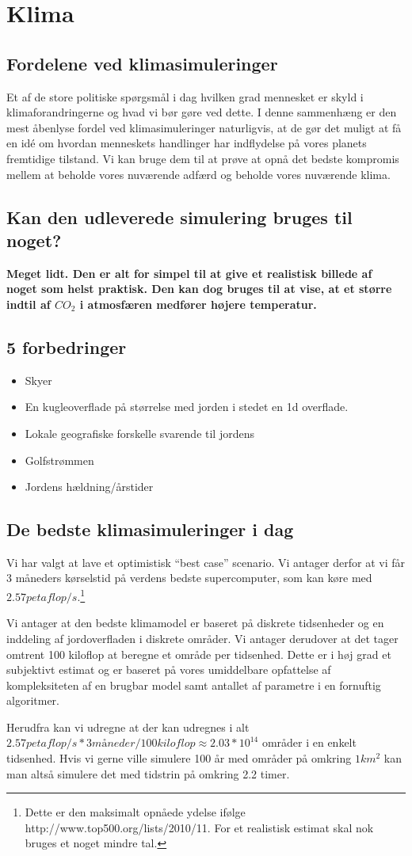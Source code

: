 \section{Klima}
\subsection{Fordelene ved klimasimuleringer}
Et af de store politiske spørgsmål i dag hvilken grad mennesket er skyld i
klimaforandringerne og hvad vi bør gøre ved dette. I denne sammenhæng er
den mest åbenlyse fordel ved klimasimuleringer naturligvis, at de gør det
muligt at få en idé om hvordan menneskets handlinger har indflydelse på vores
planets fremtidige tilstand. Vi kan bruge dem til at prøve at opnå det bedste
kompromis mellem at beholde vores nuværende adfærd og beholde vores nuværende
klima.

\subsection{Kan den udleverede simulering bruges til noget?}
\bf{Meget} lidt. Den er alt for simpel til at give et realistisk billede af
noget som helst praktisk. Den kan dog bruges til at vise, at et større indtil af
$CO_2$ i atmosfæren medfører højere temperatur.

\subsection{5 forbedringer}
\begin{itemize}
\item Skyer
\item En kugleoverflade på størrelse med jorden i stedet en 1d overflade.
\item Lokale geografiske forskelle svarende til jordens
\item Golfstrømmen
\item Jordens hældning/årstider
\end{itemize}

\subsection{De bedste klimasimuleringer i dag}
Vi har valgt at lave et optimistisk ``best case'' scenario. Vi antager
derfor at vi får 3 måneders kørselstid på verdens bedste supercomputer, som
kan køre med $2.57 petaflop/s$.\footnote{Dette er den maksimalt opnåede ydelse
ifølge http://www.top500.org/lists/2010/11. For et realistisk estimat skal nok
bruges et noget mindre tal.}

Vi antager at den bedste klimamodel er baseret på diskrete tidsenheder og en
inddeling af jordoverfladen i diskrete områder. Vi antager derudover at
det tager omtrent 100 kiloflop at beregne et område per tidsenhed. Dette er i
høj grad et subjektivt estimat og er baseret på vores umiddelbare opfattelse af
kompleksiteten af en brugbar model samt antallet af parametre i en fornuftig algoritmer.

Herudfra kan vi udregne at der kan udregnes i alt $2.57 petaflop/s * 3 måneder /
100 kiloflop \approx 2.03*10^14$ områder i en enkelt tidsenhed. Hvis vi gerne
ville simulere 100 år med områder på omkring $1 km^2$ kan man altså simulere det
med tidstrin på omkring 2.2 timer.
